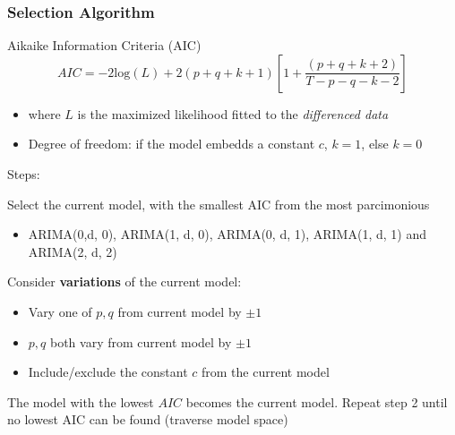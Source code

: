 \documentclass{beamer}
\newenvironment{wideenumerate}{\enumerate\addtolength{\itemsep}{10pt}}{\endenumerate}
\begin{document}
\begin{frame}
  \frametitle{Selection Algorithm}
  \begin{alertblock}{Aikaike Information Criteria (AIC)}
    \begin{equation*}
      AIC = -2 \text{log}(L) + 2(p+q+k+1) \left[ 1 + \frac{(p+q+k+2)}{T-p-q-k-2} \right]
    \end{equation*}
    \begin{itemize}
    \item where $L$ is the maximized likelihood fitted to the \emph{differenced data}
    \item Degree of freedom: if the model embedds a constant $c$, $k=1$, else $k=0$
    \end{itemize}    
  \end{alertblock}

  Steps:\\

  \begin{wideenumerate}
  \item Select the current model, with the smallest AIC from the most parcimonious
    \begin{itemize}
    \item ARIMA(0,d, 0), ARIMA(1, d, 0), ARIMA(0, d, 1), ARIMA(1, d, 1) and ARIMA(2, d, 2)
    \end{itemize}
  \item Consider \textbf{variations} of the current model:
    \begin{itemize}
    \item Vary one of $p, q$ from current model by $\pm 1$
    \item $p, q$ both vary from current model by $\pm 1$
    \item Include/exclude the constant $c$ from the current model
    \end{itemize}
  \item The model with the lowest $AIC$ becomes the current model. Repeat step 2 until no lowest AIC can be found (traverse model space)
  \end{wideenumerate}

  
\end{frame}
\end{document}
